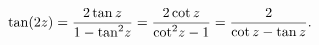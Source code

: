 \[\mathop{\tan\/}\nolimits\!\left(2z\right)=\frac{2\mathop{\tan\/}\nolimits z}{1%
-{\mathop{\tan\/}\nolimits^{2}}z}=\frac{2\mathop{\cot\/}\nolimits z}{{\mathop{%
\cot\/}\nolimits^{2}}z-1}=\frac{2}{\mathop{\cot\/}\nolimits z-\mathop{\tan\/}%
\nolimits z}.\]